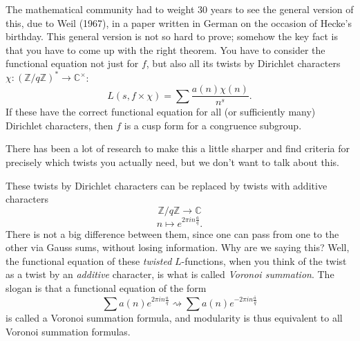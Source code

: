 \documentclass[reqno]{amsart} 
\numberwithin{theorem}{section}
\numberwithin{equation}{section}
\begin{document}
The mathematical community had to weight $30$ years to see the general version of this, due to Weil (1967), in a paper written in German on the occasion of Hecke's birthday.  This general version is not so hard to prove; somehow the key fact is that you have to come up with the right theorem.  You have to consider the functional equation not just for $f$, but also all its twists by Dirichlet characters $\chi :(\mathbb{Z} / q \mathbb{Z})^\ast \rightarrow \mathbb{C}^\times$:
\begin{equation*}
  L(s, f \times \chi) = \sum \frac{a(n) \chi(n)}{ n^s}.
\end{equation*}
If these have the correct functional equation for all (or sufficiently many) Dirichlet characters, then $f$ is a cusp form for a congruence subgroup.

There has been a lot of research to make this a little sharper and find criteria for precisely which twists you actually need, but we don't want to talk about this.

\begin{remark}
  These twists by Dirichlet characters can be replaced by twists with additive characters
  \begin{equation*}
    \mathbb{Z} / q \mathbb{Z} \rightarrow \mathbb{C}
  \end{equation*}
  \begin{equation*}
    n \mapsto e^{2 \pi i n \tfrac{a}{q}}.
  \end{equation*}
  There is not a big difference between them, since one can pass from one to the other via Gauss sums, without losing information.  Why are we saying this?  Well, the functional equation of these \emph{twisted} $L$-functions, when you think of the twist as a twist by an \emph{additive} character, is what is called \emph{Voronoi summation}.  The slogan is that a functional equation of the form
  \begin{equation*}
    \sum a(n) e^{2 \pi i n \tfrac{a}{q}} \rightsquigarrow \sum a(n) e^{- 2 \pi i n \tfrac{\bar{a}}{q}}
  \end{equation*}
  is called a Voronoi summation formula, and modularity is thus equivalent to all Voronoi summation formulas.
\end{remark}
\end{document}

